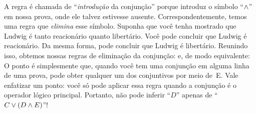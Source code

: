 A regra é chamada de \textquotedblleft\emph{introdução} da conjunção\textquotedblright{} porque introduz o símbolo \textquotedblleft$\wedge$\textquotedblright{} em nossa prova, onde ele talvez estivesse ausente. Correspondentemente, temos uma regra que \emph{elimina} esse símbolo. Suponha que você tenha mostrado que Ludwig é tanto reacionário quanto libertário. Você pode concluir que Ludwig é reacionário. Da mesma forma, pode concluir que Ludwig é libertário. Reunindo isso, obtemos nossas regras de eliminação da conjunção:
e, de modo equivalente:
O ponto é simplesmente que, quando você tem uma conjunção em alguma linha de uma prova, pode obter qualquer um dos conjuntivos por meio de~{\eand}E. Vale enfatizar um ponto: você só pode aplicar essa regra quando a conjunção é o operador lógico principal. Portanto, não pode inferir \textquotedblleft$D$\textquotedblright{} apenas de \textquotedblleft$C \vee (D \wedge E)$\textquotedblright{}!

